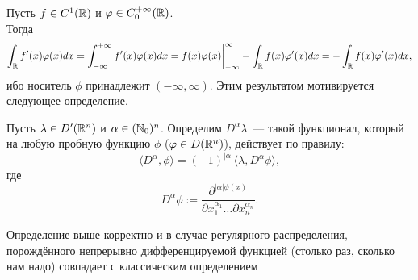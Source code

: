 \begin{note}
    Пусть $f \in C^1(\mathbb{R})$ и $\varphi \in C^{+\infty}_0(\mathbb{R})$. \\
    Тогда
    \[
        \int_{\mathbb{R}} f'(x)\varphi(x) dx = \int_{-\infty}^{+\infty} f'(x) \varphi(x) dx = f(x)\varphi(x) \bigg|^{\infty}_{-\infty} - \int_{\mathbb{R}}f(x) \varphi'(x) dx = -\int_{\mathbb{R}}f(x) \varphi'(x) dx,
    \]
    ибо носитель $\phi$ принадлежит $(-\infty, \infty)$.
    Этим результатом мотивируется следующее определение.
\end{note}
\begin{definition}
    Пусть $\lambda \in D'(\mathbb{R}^n)$ и $\alpha \in (\mathbb{N}_0)^n$.
    Определим $D^\alpha \lambda$~--- такой функционал, который на любую пробную  функцию $\phi$ ($\varphi \in D(\mathbb{R}^n)$), действует по правилу:
    \[
        \langle D^{\alpha}, \phi \rangle = (-1)^{|\alpha|} \langle \lambda, D^{\alpha}\phi \rangle, 
    \]
    где 
    \[
    D^{\alpha}\phi:= \dfrac{\partial^{|\alpha|\phi(x)}}{\partial x_1^{\alpha_1}\dots\partial x_n^{\alpha_n}}.
    \]
\end{definition}
\begin{theorem}
    Определение выше корректно и в случае регулярного распределения, порождённого непрерывно дифференцируемой функцией (столько раз, сколько нам надо) совпадает с классическим определением
\end{theorem}
